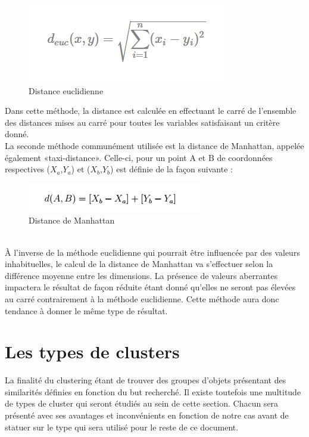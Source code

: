 \documentclass[memoire.tex]{subfiles}
\begin{document}
	\begin{figure}[h!]
		\centerline{\includegraphics[scale=0.8]{img/euclidienne_distance.png}}
		\caption{Distance euclidienne}
	\end{figure}
Dans cette méthode, la distance est calculée en effectuant le carré de l'ensemble des distances mises au carré pour toutes les variables satisfaisant un critère donné.\\
La seconde méthode communément utilisée est la distance de Manhattan, appelée également «taxi-distance». Celle-ci, pour un point A et B de coordonnées respectives ($X_{a}$,$Y_{a}$) et ($X_{b}$,$Y_{b}$) est définie de la façon  suivante :\\
	\begin{figure}[h!]
		\centerline{\includegraphics[scale=0.8]{img/manhatan_distance.png}}
		\caption{Distance de Manhattan}
	\end{figure}\\
À l'inverse de la méthode euclidienne qui pourrait être influencée par des valeurs inhabituelles, le calcul de la distance de Manhattan va s'effectuer selon la différence moyenne entre les dimensions. La présence de valeurs aberrantes impactera le résultat de façon réduite étant donné qu'elles ne seront pas élevées au carré contrairement à la méthode euclidienne. Cette méthode aura donc tendance à donner le même type de résultat.
\newpage


\section{Les types de clusters}

La finalité du clustering étant de trouver des groupes d'objets présentant des similarités
définies en fonction du but recherché. Il existe toutefois une multitude de types de cluster qui seront étudiés au sein de cette section. Chacun sera présenté avec ses avantages et inconvénients en fonction de notre cas avant de statuer sur le type qui sera utilisé pour le reste de ce document.
\end{document}
